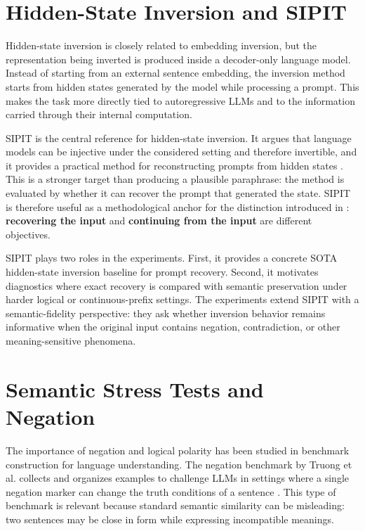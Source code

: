 \documentclass[12pt,a4paper,twoside,openright]{book}
\begin{document}
\section{Hidden-State Inversion and SIPIT}
\label{sec:related-sipit}

Hidden-state inversion is closely related to embedding inversion, but the
representation being inverted is produced inside a decoder-only language model.
Instead of starting from an external sentence embedding, the inversion method
starts from hidden states generated by the model while processing a prompt.
This makes the task more directly tied to autoregressive LLMs and to the
information carried through their internal computation.

SIPIT is the central reference for hidden-state inversion. It argues that
language models can be injective under the considered setting and therefore
invertible, and it provides a practical method for reconstructing prompts from
hidden states \cite{DBLP:journals/corr/abs-2510-15511}. This is a stronger target than
producing a plausible paraphrase: the method is evaluated by whether it can
recover the prompt that generated the state. SIPIT is therefore useful as a
methodological anchor for the distinction introduced in
: \textbf{recovering the input} and
\textbf{continuing from the input} are different objectives.

SIPIT plays two roles in the experiments. First, it provides a concrete SOTA
hidden-state inversion baseline for prompt recovery. Second, it motivates
diagnostics where exact recovery is compared with semantic preservation under
harder logical or continuous-prefix settings. The experiments extend SIPIT with
a semantic-fidelity perspective: they ask whether inversion behavior remains
informative when the original input contains negation, contradiction, or other
meaning-sensitive phenomena.

\section{Semantic Stress Tests and Negation}
\label{sec:related-semantic-stress-tests}

The importance of negation and logical polarity has been studied in benchmark
construction for language understanding. The negation benchmark by Truong et
al. collects and organizes examples to challenge LLMs in settings where a
single negation marker can change the truth conditions of a sentence
\cite{DBLP:journals/corr/abs-2310-15941}. This type of benchmark is relevant because
standard semantic similarity can be misleading: two sentences may be close in
form while expressing incompatible meanings.
\end{document}
